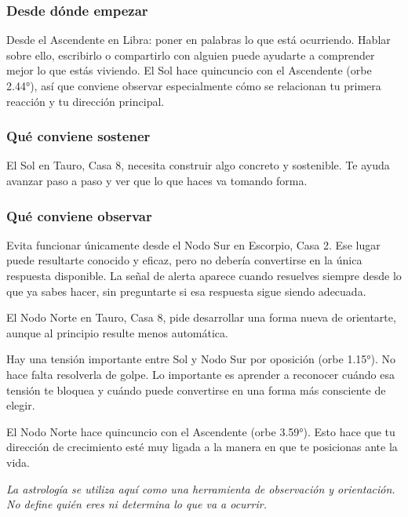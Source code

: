 \documentclass[11pt,a4paper]{article}
\begin{document}
\subsubsection*{Desde dónde empezar}
Desde el Ascendente en Libra: poner en palabras lo que está ocurriendo. Hablar sobre ello, escribirlo o compartirlo con alguien puede ayudarte a comprender mejor lo que estás viviendo. El Sol hace quincuncio con el Ascendente (orbe 2.44°), así que conviene observar especialmente cómo se relacionan tu primera reacción y tu dirección principal.

\subsubsection*{Qué conviene sostener}
El Sol en Tauro, Casa 8, necesita construir algo concreto y sostenible. Te ayuda avanzar paso a paso y ver que lo que haces va tomando forma.

\subsubsection*{Qué conviene observar}
Evita funcionar únicamente desde el Nodo Sur en Escorpio, Casa 2. Ese lugar puede resultarte conocido y eficaz, pero no debería convertirse en la única respuesta disponible. La señal de alerta aparece cuando resuelves siempre desde lo que ya sabes hacer, sin preguntarte si esa respuesta sigue siendo adecuada.

El Nodo Norte en Tauro, Casa 8, pide desarrollar una forma nueva de orientarte, aunque al principio resulte menos automática.

Hay una tensión importante entre Sol y Nodo Sur por oposición (orbe 1.15°). No hace falta resolverla de golpe. Lo importante es aprender a reconocer cuándo esa tensión te bloquea y cuándo puede convertirse en una forma más consciente de elegir.

El Nodo Norte hace quincuncio con el Ascendente (orbe 3.59°). Esto hace que tu dirección de crecimiento esté muy ligada a la manera en que te posicionas ante la vida.

\vspace{1cm}

\begin{center}
{\small\itshape\color{grisai}
La astrología se utiliza aquí como una herramienta de observación y orientación.
No define quién eres ni determina lo que va a ocurrir.
}
\end{center}
\end{document}
